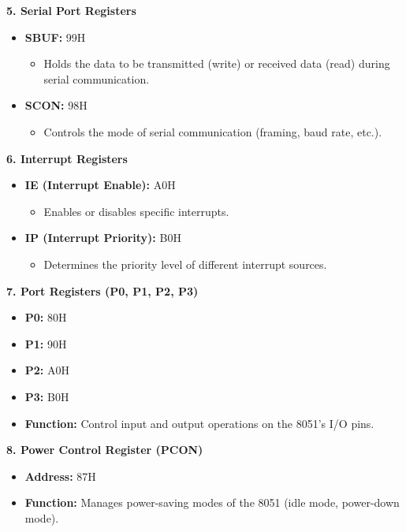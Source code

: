 \documentclass[
]{article}
\begin{document}
\textbf{5. Serial Port Registers}

\begin{itemize}
\item
  \textbf{SBUF:} 99H

  \begin{itemize}
  \item
    Holds the data to be transmitted (write) or received data (read)
    during serial communication.
  \end{itemize}
\item
  \textbf{SCON:} 98H

  \begin{itemize}
  \item
    Controls the mode of serial communication (framing, baud rate,
    etc.).
  \end{itemize}
\end{itemize}

\textbf{6. Interrupt Registers}

\begin{itemize}
\item
  \textbf{IE (Interrupt Enable):} A0H

  \begin{itemize}
  \item
    Enables or disables specific interrupts.
  \end{itemize}
\item
  \textbf{IP (Interrupt Priority):} B0H

  \begin{itemize}
  \item
    Determines the priority level of different interrupt sources.
  \end{itemize}
\end{itemize}

\textbf{7. Port Registers (P0, P1, P2, P3)}

\begin{itemize}
\item
  \textbf{P0:} 80H
\item
  \textbf{P1:} 90H
\item
  \textbf{P2:} A0H
\item
  \textbf{P3:} B0H
\item
  \textbf{Function:} Control input and output operations on the 8051's
  I/O pins.
\end{itemize}

\textbf{8. Power Control Register (PCON)}

\begin{itemize}
\item
  \textbf{Address:} 87H
\item
  \textbf{Function:} Manages power-saving modes of the 8051 (idle mode,
  power-down mode).
\end{itemize}
\end{document}
